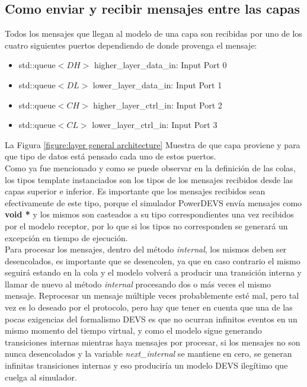 \documentclass[10pt,a4paper]{article}
\begin{document}
\subsection{Como enviar y recibir mensajes entre las capas}

Todos los mensajes que llegan al modelo de una capa son recibidas por uno de los cuatro siguientes puertos dependiendo de donde provenga el mensaje:
\begin{itemize}
\item std::queue$<DH>$ higher\_layer\_data\_in:  Input Port 0
\item std::queue$<DL>$ lower\_layer\_data\_in:   Input Port 1
\item std::queue$<CH>$ higher\_layer\_ctrl\_in:  Input Port 2 
\item std::queue$<CL>$ lower\_layer\_ctrl\_in:   Input Port 3
\end{itemize}

La Figura \ref{figure:layer general architecture} Muestra de que capa proviene y para que tipo de datos está pensado cada uno de estos puertos. \\

Como ya fue mencionado y como se puede observar en la definición de las colas, los tipos template instanciados son los tipos de los mensajes recibidos desde las capas superior e inferior. Es importante que los mensajes recibidos sean efectivamente de este tipo, porque el simulador PowerDEVS envía mensajes como \textbf{void *} y los mismos son casteados a su tipo correspondientes una vez recibidos por el modelo receptor, por lo que si los tipos no corresponden se generará un excepción en tiempo de ejecución. \\

Para procesar los mensajes, dentro del método \textit{internal}, los mismos deben ser desencolados, es importante que se desencolen, ya que en caso contrario el mismo seguirá estando en la cola y el modelo volverá a producir una transición interna y llamar de nuevo al método \textit{internal} procesando dos o más veces el mismo mensaje. Reprocesar un mensaje múltiple veces probablemente esté mal, pero tal vez es lo deseado por el protocolo, pero hay que tener en cuenta que una de las pocas exigencias del formalismo DEVS es que no ocurran infinitos eventos en un mismo momento del tiempo virtual, y como el modelo sigue generando transiciones internas mientras haya mensajes por procesar, si los mensajes no son nunca desencolados y la variable \textit{next\_internal} se mantiene en cero, se generan infinitas transiciones internas y eso produciría un modelo DEVS ilegítimo que cuelga al simulador. \\
\end{document}

